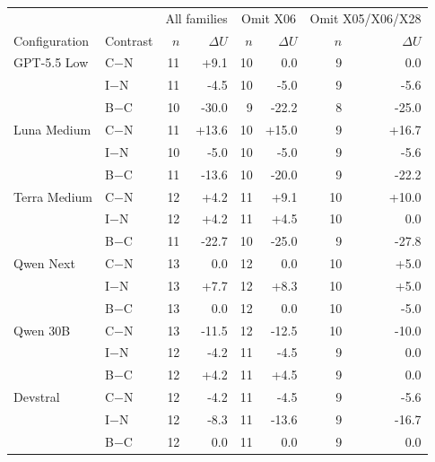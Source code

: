 \begin{tabular}{llrrrrrr}
\toprule
& & \multicolumn{2}{c}{All families} & \multicolumn{2}{c}{Omit X06} & \multicolumn{2}{c}{Omit X05/X06/X28}\\
Configuration & Contrast & $n$ & $\Delta U$ & $n$ & $\Delta U$ & $n$ & $\Delta U$\\
\midrule
GPT-5.5 Low & C$-$N & 11 & +9.1 & 10 & 0.0 & 9 & 0.0\\
 & I$-$N & 11 & -4.5 & 10 & -5.0 & 9 & -5.6\\
 & B$-$C & 10 & -30.0 & 9 & -22.2 & 8 & -25.0\\
Luna Medium & C$-$N & 11 & +13.6 & 10 & +15.0 & 9 & +16.7\\
 & I$-$N & 10 & -5.0 & 10 & -5.0 & 9 & -5.6\\
 & B$-$C & 11 & -13.6 & 10 & -20.0 & 9 & -22.2\\
Terra Medium & C$-$N & 12 & +4.2 & 11 & +9.1 & 10 & +10.0\\
 & I$-$N & 12 & +4.2 & 11 & +4.5 & 10 & 0.0\\
 & B$-$C & 11 & -22.7 & 10 & -25.0 & 9 & -27.8\\
Qwen Next & C$-$N & 13 & 0.0 & 12 & 0.0 & 10 & +5.0\\
 & I$-$N & 13 & +7.7 & 12 & +8.3 & 10 & +5.0\\
 & B$-$C & 13 & 0.0 & 12 & 0.0 & 10 & -5.0\\
Qwen 30B & C$-$N & 13 & -11.5 & 12 & -12.5 & 10 & -10.0\\
 & I$-$N & 12 & -4.2 & 11 & -4.5 & 9 & 0.0\\
 & B$-$C & 12 & +4.2 & 11 & +4.5 & 9 & 0.0\\
Devstral & C$-$N & 12 & -4.2 & 11 & -4.5 & 9 & -5.6\\
 & I$-$N & 12 & -8.3 & 11 & -13.6 & 9 & -16.7\\
 & B$-$C & 12 & 0.0 & 11 & 0.0 & 9 & 0.0\\
\bottomrule
\end{tabular}
